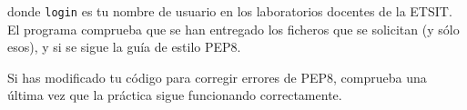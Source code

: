 \documentclass[11pt,a4paper]{article}
\begin{document}
donde \texttt{login} es tu nombre de usuario en los laboratorios docentes de la ETSIT. El programa comprueba que se han entregado los ficheros que se solicitan (y sólo esos), y si se sigue la guía de estilo PEP8. 

Si has modificado tu código para corregir errores de PEP8, comprueba una última vez que la práctica sigue funcionando correctamente.




\end{document}
